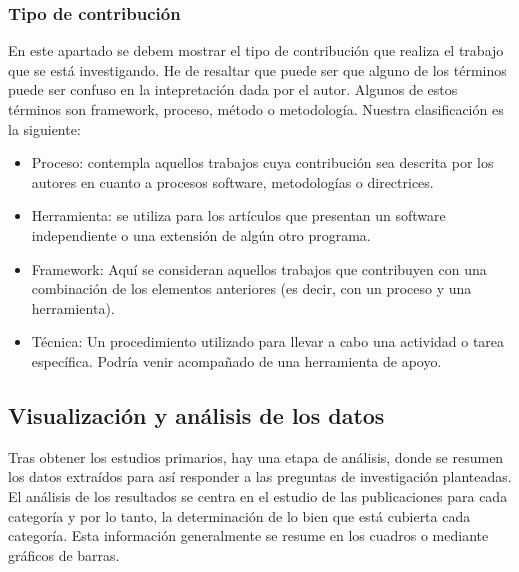 \subsubsection{Tipo de contribución}
En este apartado se debem mostrar el tipo de contribución que realiza el trabajo que se está investigando. He de resaltar que puede ser que alguno de los términos puede ser confuso en la intepretación dada por el autor. Algunos de estos términos son framework, proceso, método o metodología. Nuestra clasificación es la siguiente:
\begin{itemize}
\item Proceso: contempla aquellos trabajos cuya contribución sea descrita por los autores en cuanto a procesos software, metodologías o directrices.
\item Herramienta: se utiliza para los artículos que presentan un software independiente o una extensión de algún otro programa.
\item Framework: Aquí se consideran aquellos trabajos que contribuyen con una combinación de los elementos anteriores (es decir, con un proceso y una herramienta).
\item Técnica: Un procedimiento utilizado para llevar a cabo una actividad o tarea específica. Podría venir acompañado de una herramienta de apoyo.
\end{itemize}

\subsection{Visualización y análisis de los datos}
Tras obtener los estudios primarios, hay una etapa de análisis, donde se resumen los datos extraídos para así responder a las preguntas de investigación planteadas.
El análisis de los resultados se centra en el estudio de las publicaciones para cada categoría y por lo tanto, la determinación de lo bien que está cubierta cada categoría. Esta información generalmente se resume en los cuadros o mediante gráficos de barras. %


